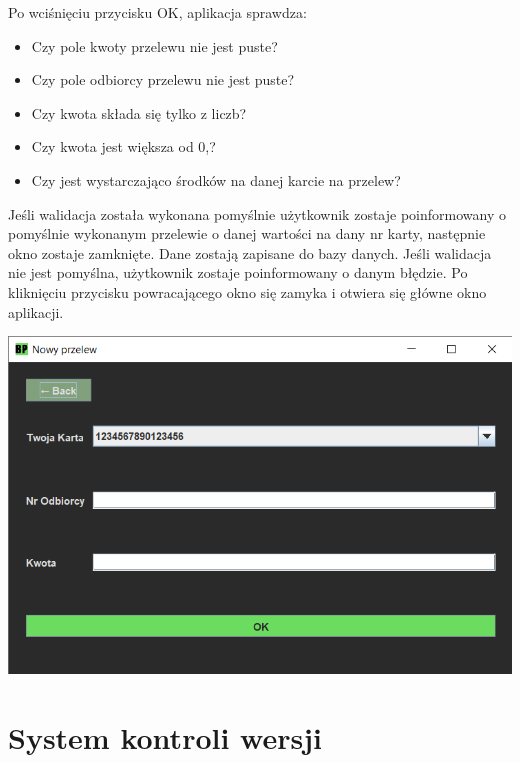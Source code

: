 \documentclass[12pt, letterpaper]{article}
\begin{document}
\quad Po wciśnięciu przycisku OK, aplikacja sprawdza:

\begin{itemize}
\item Czy pole kwoty przelewu nie jest puste?
\item Czy pole odbiorcy przelewu nie jest puste?
\item Czy kwota składa się tylko z liczb?
\item Czy kwota jest większa od 0,?
\item Czy jest wystarczająco środków na danej karcie na przelew?
\end{itemize}

\quad Jeśli walidacja została wykonana pomyślnie użytkownik zostaje poinformowany o pomyślnie wykonanym przelewie o danej wartości na dany nr karty, następnie okno zostaje zamknięte. Dane zostają zapisane do bazy danych. 
Jeśli walidacja nie jest pomyślna, użytkownik zostaje poinformowany o danym błędzie. 
Po kliknięciu przycisku powracającego okno się zamyka i otwiera się główne okno aplikacji.

\begin{center}
	\includegraphics[scale=0.5]{przelew}
\end{center}

\newpage



\section{System kontroli wersji}
\end{document}

